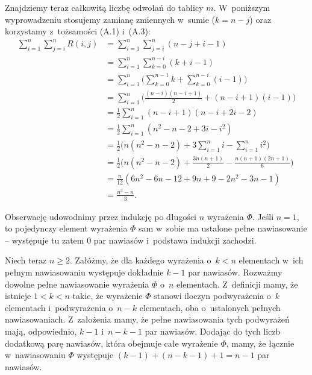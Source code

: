 Znajdziemy teraz całkowitą liczbę odwołań do tablicy $m$.
W~poniższym wyprowadzeniu stosujemy zamianę zmiennych w~sumie ($k=n-j$) oraz korzystamy z~tożsamości (A.1) i~(A.3):
\begin{align*}
	\sum_{i=1}^n\sum_{j=i}^nR(i,j) &= \sum_{i=1}^n\sum_{j=i}^n(n-j+i-1) \\
	&= \sum_{i=1}^n\sum_{k=0}^{n-i}(k+i-1) \\
	&= \sum_{i=1}^n\biggl(\sum_{k=0}^{n-1}k+\sum_{k=0}^{n-i}(i-1)\biggr) \\
	&= \sum_{i=1}^n\biggl(\frac{(n-i)(n-i+1)}{2}+(n-i+1)(i-1)\biggr) \\
	&= \frac{1}{2}\sum_{i=1}^n(n-i+1)(n-i+2i-2) \\
	&= \frac{1}{2}\sum_{i=1}^n(n^2-n-2+3i-i^2) \\
	&= \frac{1}{2}\biggl(n(n^2-n-2)+3\sum_{i=1}^ni-\sum_{i=1}^ni^2\biggr) \\
	&= \frac{1}{2}\biggl(n(n^2-n-2)+\frac{3n(n+1)}{2}-\frac{n(n+1)(2n+1)}{6}\biggr) \\
	&= \frac{n}{12}(6n^2-6n-12+9n+9-2n^2-3n-1) \\[1mm]
	&= \frac{n^3-n}{3}.
\end{align*}

\exercise %
Obserwację udowodnimy przez indukcję po długości $n$ wyrażenia $\Phi$.
Jeśli $n=1$, to pojedynczy element wyrażenia $\Phi$ sam w~sobie ma ustalone pełne nawiasowanie -- występuje tu zatem 0 par nawiasów i~podstawa indukcji zachodzi.

Niech teraz $n\ge2$.
Załóżmy, że dla każdego wyrażenia o~$k<n$ elementach w~ich pełnym nawiasowaniu występuje dokładnie $k-1$ par nawiasów.
Rozważmy dowolne pełne nawiasowanie wyrażenia $\Phi$ o~$n$ elementach.
Z~definicji mamy, że istnieje $1<k<n$ takie, że wyrażenie $\Phi$ stanowi iloczyn podwyrażenia o~$k$ elementach i~podwyrażenia o~$n-k$ elementach, oba o~ustalonych pełnych nawiasowaniach.
Z~założenia mamy, że pełne nawiasowania tych podwyrażeń mają, odpowiednio, $k-1$ i~$n-k-1$ par nawiasów.
Dodając do tych liczb dodatkową parę nawiasów, która obejmuje całe wyrażenie $\Phi$, mamy, że łącznie w~nawiasowaniu $\Phi$ występuje $(k-1)+(n-k-1)+1=n-1$ par nawiasów.
